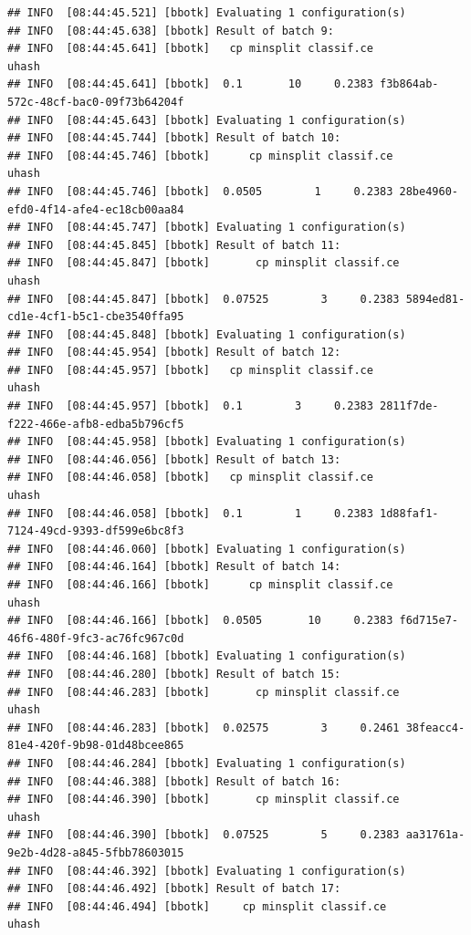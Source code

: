 \documentclass[
]{scrbook}
\begin{document}
\begin{verbatim}
## INFO  [08:44:45.521] [bbotk] Evaluating 1 configuration(s) 
## INFO  [08:44:45.638] [bbotk] Result of batch 9: 
## INFO  [08:44:45.641] [bbotk]   cp minsplit classif.ce                                uhash 
## INFO  [08:44:45.641] [bbotk]  0.1       10     0.2383 f3b864ab-572c-48cf-bac0-09f73b64204f 
## INFO  [08:44:45.643] [bbotk] Evaluating 1 configuration(s) 
## INFO  [08:44:45.744] [bbotk] Result of batch 10: 
## INFO  [08:44:45.746] [bbotk]      cp minsplit classif.ce                                uhash 
## INFO  [08:44:45.746] [bbotk]  0.0505        1     0.2383 28be4960-efd0-4f14-afe4-ec18cb00aa84 
## INFO  [08:44:45.747] [bbotk] Evaluating 1 configuration(s) 
## INFO  [08:44:45.845] [bbotk] Result of batch 11: 
## INFO  [08:44:45.847] [bbotk]       cp minsplit classif.ce                                uhash 
## INFO  [08:44:45.847] [bbotk]  0.07525        3     0.2383 5894ed81-cd1e-4cf1-b5c1-cbe3540ffa95 
## INFO  [08:44:45.848] [bbotk] Evaluating 1 configuration(s) 
## INFO  [08:44:45.954] [bbotk] Result of batch 12: 
## INFO  [08:44:45.957] [bbotk]   cp minsplit classif.ce                                uhash 
## INFO  [08:44:45.957] [bbotk]  0.1        3     0.2383 2811f7de-f222-466e-afb8-edba5b796cf5 
## INFO  [08:44:45.958] [bbotk] Evaluating 1 configuration(s) 
## INFO  [08:44:46.056] [bbotk] Result of batch 13: 
## INFO  [08:44:46.058] [bbotk]   cp minsplit classif.ce                                uhash 
## INFO  [08:44:46.058] [bbotk]  0.1        1     0.2383 1d88faf1-7124-49cd-9393-df599e6bc8f3 
## INFO  [08:44:46.060] [bbotk] Evaluating 1 configuration(s) 
## INFO  [08:44:46.164] [bbotk] Result of batch 14: 
## INFO  [08:44:46.166] [bbotk]      cp minsplit classif.ce                                uhash 
## INFO  [08:44:46.166] [bbotk]  0.0505       10     0.2383 f6d715e7-46f6-480f-9fc3-ac76fc967c0d 
## INFO  [08:44:46.168] [bbotk] Evaluating 1 configuration(s) 
## INFO  [08:44:46.280] [bbotk] Result of batch 15: 
## INFO  [08:44:46.283] [bbotk]       cp minsplit classif.ce                                uhash 
## INFO  [08:44:46.283] [bbotk]  0.02575        3     0.2461 38feacc4-81e4-420f-9b98-01d48bcee865 
## INFO  [08:44:46.284] [bbotk] Evaluating 1 configuration(s) 
## INFO  [08:44:46.388] [bbotk] Result of batch 16: 
## INFO  [08:44:46.390] [bbotk]       cp minsplit classif.ce                                uhash 
## INFO  [08:44:46.390] [bbotk]  0.07525        5     0.2383 aa31761a-9e2b-4d28-a845-5fbb78603015 
## INFO  [08:44:46.392] [bbotk] Evaluating 1 configuration(s) 
## INFO  [08:44:46.492] [bbotk] Result of batch 17: 
## INFO  [08:44:46.494] [bbotk]     cp minsplit classif.ce                                uhash 

\end{verbatim}
\end{document}
